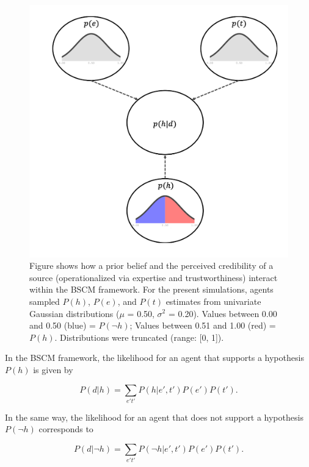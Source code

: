 \documentclass[doc,floatsintext]{apa6}
\begin{document}
\begin{figure}[!t]
\centering
\includegraphics[width=1\columnwidth]{img/bscm_update_2.png}
\caption{Figure shows how a prior belief and the perceived credibility of a source (operationalized via expertise and trustworthiness) interact within the BSCM framework. For the present simulations, agents sampled \(P(h)\), \(P(e)\), and \(P(t)\) estimates from univariate Gaussian distributions (\(\mu\) = 0.50, \(\sigma^2\) = 0.20). Values between 0.00 and 0.50 (blue) =  \(P(\neg h)\); Values between 0.51 and 1.00 (red) =  \(P(h)\). Distributions were truncated (range: [0, 1]).} 
\label{fig:rich_vis}
\end{figure}


In the BSCM framework, the likelihood for an agent that supports a hypothesis  \(P(h)\) is given by

\begin{equation}
    P(d|h) = \sum_{e't'}P(h|e',t')P(e')P(t'). 
\end{equation}

In the same way, the likelihood for an agent that does not support a hypothesis \(P(\neg h)\) corresponds to
   
\begin{equation}
    P(d|\neg h) = \sum_{e't'}P(\neg h|e',t')P(e')P(t'). 
\end{equation}
\end{document}
